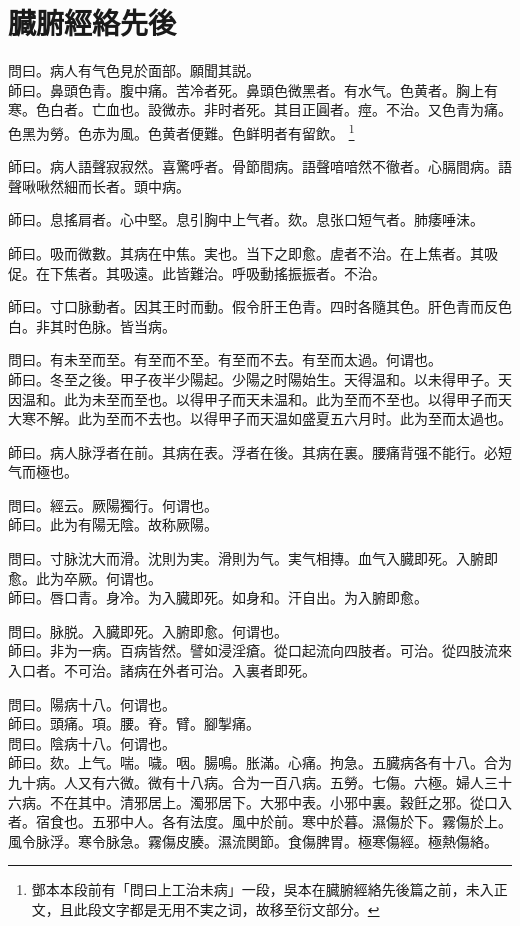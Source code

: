 \chapter{臓腑經絡先後}

問曰。病人有气色見於面部。願聞其説。\\
師曰。鼻頭色青。腹中痛。苦冷者死。鼻頭色微黑者。有水气。色黄者。胸上有寒。色白者。亡血也。設微赤。非时者死。其目正圓者。痙。不治。又色青为痛。色黑为勞。色赤为風。色黄者便難。色鲜明者有留飲。
	\footnote{
		鄧本本段前有「問曰上工治未病」一段，吳本在臓腑經絡先後篇之前，未入正文，且此段文字都是无用不実之词，故移至衍文部分。
	}

師曰。病人語聲寂寂然。喜驚呼者。骨節間病。語聲喑喑然不徹者。心膈間病。語聲啾啾然細而长者。頭中病。

師曰。息搖肩者。心中堅。息引胸中上气者。欬。息张口短气者。肺痿唾沫。

師曰。吸而微數。其病在中焦。実也。当下之即愈。虗者不治。在上焦者。其吸促。在下焦者。其吸遠。此皆難治。呼吸動搖振振者。不治。

師曰。寸口脉動者。因其王时而動。假令肝王色青。四时各隨其色。肝色青而反色白。非其时色脉。皆当病。

問曰。有未至而至。有至而不至。有至而不去。有至而太過。何谓也。\\
師曰。冬至之後。甲子夜半少陽起。少陽之时陽始生。天得温和。以未得甲子。天因温和。此为未至而至也。以得甲子而天未温和。此为至而不至也。以得甲子而天大寒不解。此为至而不去也。以得甲子而天温如盛夏五六月时。此为至而太過也。

師曰。病人脉浮者在前。其病在表。浮者在後。其病在裏。腰痛背强不能行。必短气而極也。

問曰。經云。厥陽獨行。何谓也。\\
師曰。此为有陽无陰。故称厥陽。

問曰。寸脉沈大而滑。沈則为実。滑則为气。実气相摶。血气入臓即死。入腑即愈。此为卒厥。何谓也。\\
師曰。唇口青。身冷。为入臓即死。如身和。汗自出。为入腑即愈。

問曰。脉脱。入臓即死。入腑即愈。何谓也。\\
師曰。非为一病。百病皆然。譬如浸淫瘡。從口起流向四肢者。可治。從四肢流來入口者。不可治。{\khaai 諸}病在外者可治。入裏者即死。

問曰。陽病十八。何谓也。\\
師曰。頭痛。項。腰。脊。臂。腳掣痛。\\
問曰。陰病十八。何谓也。\\
師曰。欬。上气。喘。噦。咽。腸鳴。胀滿。心痛。拘急。五臓病各有十八。合为九十病。人又有六微。微有十八病。合为一百八病。五勞。七傷。六極。婦人三十六病。不在其中。清邪居上。濁邪居下。大邪中表。小邪中裏。穀飪之邪。從口入者。宿食也。五邪中人。各有法度。風中於前。寒中於暮。濕傷於下。霧傷於上。風令脉浮。寒令脉急。霧傷皮腠。濕流関節。食傷脾胃。極寒傷經。極熱傷絡。

